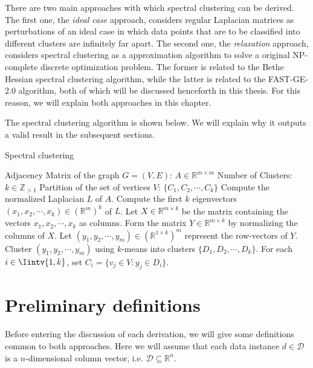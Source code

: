 There are two main approaches with which spectral clustering can be derived.
The first one, the \textit{ideal case} approach, considers regular Laplacian matrices as perturbations of an ideal case in which data points that are to be classified into different clusters are infinitely far apart.
The second one, the \textit{relaxation} approach, considers spectral clustering as a approximation algorithm to solve a original NP-complete discrete optimization problem.
The former is related to the Bethe Hessian spectral clustering algorithm, while the latter is related to the FAST-GE-2.0 algorithm, both of which will be discussed henceforth in this thesis.
For this reason, we will explain both approaches in this chapter.

The spectral clustering algorithm is shown below.
We will explain why it outputs a valid result in the subsequent sections.

\begin{algorithm}
\caption{Spectral clustering}\label{spectral_clustering}
\begin{algorithmic}[1]
   \INPUT
      \Statex Adjacency Matrix of the graph $G = (V,E)$: $A \in \mathbb R ^ {m \times m}$ 
      \Statex Number of Clusters: $k \in \mathbb Z_{>1}$
   \OUTPUT
      \Statex Partition of the set of vertices $V$: $\{ C_1, C_2, \cdots, C_k \}$
      \vspace{0.2 cm}
   \State Compute the normalized Laplacian $L$ of $A$.
   \State Compute the first $k$ eigenvectors $(x_1, x_2, \cdots, x_k) \in (\mathbb R^{m})^k$ of $L$.
   \State Let $X \in \mathbb R^{m \times k}$ be the matrix containing the vectors $x_1, x_2, \cdots, x_k$ as columns.
   \State Form the matrix $Y \in \mathbb R^{m \times k}$ by normalizing the columns of $X$.
   \State Let $(y_1, y_2, \cdots, y_m) \in ( \mathbb R^{1 \times k} )^m$ represent the row-vectors of $Y$.
   \State Cluster $(y_1, y_2, \cdots, y_m)$ using $k$-means into clusters $\{ D_1, D_2, \cdots, D_k \} $.
   \State For each $i \in \Iintv{1,k}$, set $C_i = \{ v_j \in V: y_j \in D_i \}$.
\end{algorithmic}
\end{algorithm}




\section{Preliminary definitions} 
Before entering the discussion of each derivation, we will give some definitions common to both approaches.
Here we will assume that each data instance $d \in \mathcal D$ is a $n$-dimensional column vector, i.e. $\mathcal D \subseteq \mathbb R^{n }$.

